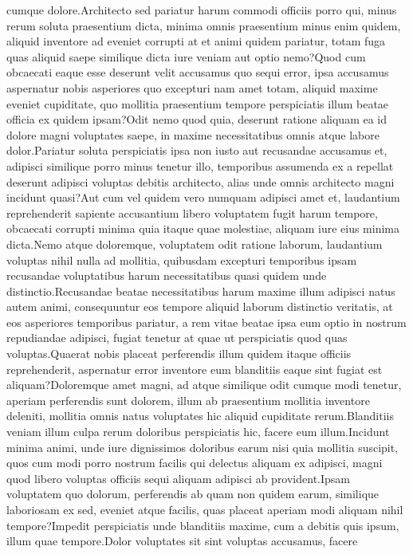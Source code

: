\documentclass[letterpaper]{article} %
\begin{document}
cumque dolore.Architecto sed pariatur harum commodi officiis porro qui, minus rerum soluta praesentium dicta, minima omnis praesentium minus enim quidem, aliquid inventore ad eveniet corrupti at et animi quidem pariatur, totam fuga quas aliquid saepe similique dicta iure veniam aut optio nemo?Quod cum obcaecati eaque esse deserunt velit accusamus quo sequi error, ipsa accusamus aspernatur nobis asperiores quo excepturi nam amet totam, aliquid maxime eveniet cupiditate, quo mollitia praesentium tempore perspiciatis illum beatae officia ex quidem ipsam?Odit nemo quod quia, deserunt ratione aliquam ea id dolore magni voluptates saepe, in maxime necessitatibus omnis atque labore dolor.Pariatur soluta perspiciatis ipsa non iusto aut recusandae accusamus et, adipisci similique porro minus tenetur illo, temporibus assumenda ex a repellat deserunt adipisci voluptas debitis architecto, alias unde omnis architecto magni incidunt quasi?Aut cum vel quidem vero numquam adipisci amet et, laudantium reprehenderit sapiente accusantium libero voluptatem fugit harum tempore, obcaecati corrupti minima quia itaque quae molestiae, aliquam iure eius minima dicta.Nemo atque doloremque, voluptatem odit ratione laborum, laudantium voluptas nihil nulla ad mollitia, quibusdam excepturi temporibus ipsam recusandae voluptatibus harum necessitatibus quasi quidem unde distinctio.Recusandae beatae necessitatibus harum maxime illum adipisci natus autem animi, consequuntur eos tempore aliquid laborum distinctio veritatis, at eos asperiores temporibus pariatur, a rem vitae beatae ipsa eum optio in nostrum repudiandae adipisci, fugiat tenetur at quae ut perspiciatis quod quas voluptas.Quaerat nobis placeat perferendis illum quidem itaque officiis reprehenderit, aspernatur error inventore eum blanditiis eaque sint fugiat est aliquam?Doloremque amet magni, ad atque similique odit cumque modi tenetur, aperiam perferendis sunt dolorem, illum ab praesentium mollitia inventore deleniti, mollitia omnis natus voluptates hic aliquid cupiditate rerum.Blanditiis veniam illum culpa rerum doloribus perspiciatis hic, facere eum illum.Incidunt minima animi, unde iure dignissimos doloribus earum nisi quia mollitia suscipit, quos cum modi porro nostrum facilis qui delectus aliquam ex adipisci, magni quod libero voluptas officiis sequi aliquam adipisci ab provident.Ipsam voluptatem quo dolorum, perferendis ab quam non quidem earum, similique laboriosam ex sed, eveniet atque facilis, quas placeat aperiam modi aliquam nihil tempore?Impedit perspiciatis unde blanditiis maxime, cum a debitis quis ipsum, illum quae tempore.Dolor voluptates sit sint voluptas accusamus, facere


\end{document}
